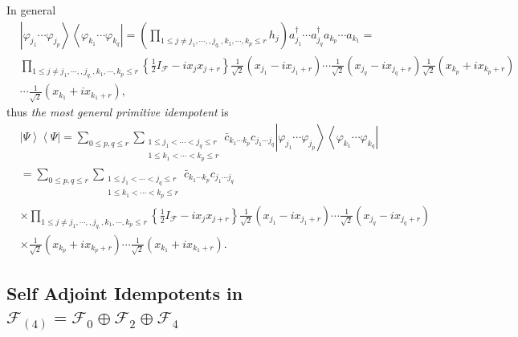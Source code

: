 \documentclass[aps,preprint]{revtex4}%
\begin{document}
In general
\begin{align}
&  \left\vert \varphi_{j_{1}}\cdots\varphi_{j_{p}}\right\rangle \left\langle
\varphi_{k_{1}}\cdots\varphi_{k_{q}}\right\vert =\left(
{\displaystyle\prod\limits_{1\leq j\neq j_{1},\cdots,,j_{q,},k_{1}%
,\cdots,k_{p}\leq r}}
h_{j}\right)  a_{j_{1}}^{\dagger}\cdots a_{j_{q}}^{\dagger}a_{k_{p}}\cdots
a_{k_{1}}=\\
&
{\displaystyle\prod\limits_{1\leq j\neq j_{1},\cdots,,j_{q,},k_{1}%
,\cdots,k_{p}\leq r}}
\left\{  \frac{1}{2}I_{\mathcal{F}}-ix_{j}x_{j+r}\right\}  \frac{1}{\sqrt{2}%
}\left(  x_{j_{1}}-ix_{j_{1}+r}\right)  \cdots\frac{1}{\sqrt{2}}\left(
x_{j_{q}}-ix_{j_{q}+r}\right)  \frac{1}{\sqrt{2}}\left(  x_{k_{p}}%
+ix_{k_{p}+r}\right) \\
&  \cdots\frac{1}{\sqrt{2}}\left(  x_{k_{1}}+ix_{k_{1}+r}\right)  ,
\end{align}
thus \emph{the most general primitive idempotent }is
\begin{align}
&  \left\vert \Psi\right\rangle \left\langle \Psi\right\vert =\sum_{0\leq
p,q\leq r}\sum_{\substack{1\leq j_{1}<\cdots<j_{q}\leq r\\1\leq k_{1}%
<\cdots<k_{p}\leq r}}\bar{c}_{k_{1}\cdots k_{p}}c_{j_{1}\cdots j_{q}%
}\left\vert \varphi_{j_{1}}\cdots\varphi_{j_{p}}\right\rangle \left\langle
\varphi_{k_{1}}\cdots\varphi_{k_{q}}\right\vert \\
&  =\sum_{0\leq p,q\leq r}\sum_{\substack{1\leq j_{1}<\cdots<j_{q}\leq
r\\1\leq k_{1}<\cdots<k_{p}\leq r}}\bar{c}_{k_{1}\cdots k_{p}}c_{j_{1}\cdots
j_{q}}\\
&  \times%
{\displaystyle\prod\limits_{1\leq j\neq j_{1},\cdots,,j_{q,},k_{1}%
,\cdots,k_{p}\leq r}}
\left\{  \frac{1}{2}I_{\mathcal{F}}-ix_{j}x_{j+r}\right\}  \frac{1}{\sqrt{2}%
}\left(  x_{j_{1}}-ix_{j_{1}+r}\right)  \cdots\frac{1}{\sqrt{2}}\left(
x_{j_{q}}-ix_{j_{q}+r}\right) \\
&  \times\frac{1}{\sqrt{2}}\left(  x_{k_{p}}+ix_{k_{p}+r}\right)  \cdots
\frac{1}{\sqrt{2}}\left(  x_{k_{1}}+ix_{k_{1}+r}\right)  .
\end{align}


\subsection{Self Adjoint Idempotents in $\mathcal{F}_{\left(  4\right)
}=\mathcal{F}_{0}\oplus\mathcal{F}_{2}\oplus\mathcal{F}_{4}$}
\end{document}
